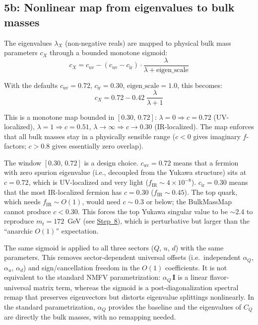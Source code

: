 \documentclass[11pt]{article}
\begin{document}
\subsection{5b: Nonlinear map from eigenvalues to bulk masses}
\label{sec:step5b}

The eigenvalues $\lambda_X$ (non-negative reals) are mapped to physical bulk
mass parameters $c_X$ through a bounded monotone sigmoid:
\begin{equation}
  c_X = c_{\mathrm{uv}} - (c_{\mathrm{uv}} - c_{\mathrm{ir}})
    \cdot \frac{\lambda}{\lambda + \text{eigen\_scale}}
\end{equation}

With the defaults $c_{\mathrm{uv}} = 0.72$, $c_{\mathrm{ir}} = 0.30$,
$\text{eigen\_scale} = 1.0$, this becomes:
\begin{equation}
  c_X = 0.72 - 0.42\;\frac{\lambda}{\lambda + 1}
\end{equation}

This is a monotone map bounded in $[0.30,\,0.72]$:
$\lambda = 0 \Rightarrow c = 0.72$ (UV-localized),
$\lambda = 1 \Rightarrow c = 0.51$,
$\lambda \to \infty \Rightarrow c \to 0.30$ (IR-localized).
The map enforces that all bulk masses stay in a physically sensible range
($c < 0$ gives imaginary $f$-factors; $c > 0.8$ gives essentially zero overlap).

The window $[0.30,\,0.72]$ is a design choice.
$c_{\mathrm{uv}} = 0.72$ means that a fermion with zero spurion eigenvalue
(i.e., decoupled from the Yukawa structure) sits at $c = 0.72$, which is
UV-localized and very light ($f_{\mathrm{IR}} \sim 4\times10^{-8}$).
$c_{\mathrm{ir}} = 0.30$ means that the most IR-localized fermion has
$c = 0.30$ ($f_{\mathrm{IR}} \sim 0.45$).  The top quark, which needs
$f_{\mathrm{IR}} \sim O(1)$, would need $c \sim 0.3$ or below; the BulkMassMap
cannot produce $c < 0.30$.  This forces the top Yukawa singular value to be
$\sim 2.4$ to reproduce $m_t = 172$~GeV (see \hyperref[sec:step8]{Step~8}),
which is perturbative but larger than the ``anarchic $O(1)$'' expectation.

The same sigmoid is applied to all three sectors ($Q$, $u$, $d$) with the
same parameters.  This removes sector-dependent universal offsets (i.e.\
independent $\alpha_Q$, $\alpha_u$, $\alpha_d$) and sign/cancellation freedom
in the $O(1)$ coefficients.  It is not equivalent to the standard NMFV
parametrization: $\alpha_Q\,\mathbf{I}$ is a linear flavor-universal matrix
term, whereas the sigmoid is a post-diagonalization spectral remap that
preserves eigenvectors but distorts eigenvalue splittings nonlinearly.  In the
standard parametrization, $\alpha_Q$ provides the baseline and the eigenvalues
of $C_Q$ are directly the bulk masses, with no remapping needed.
\end{document}
